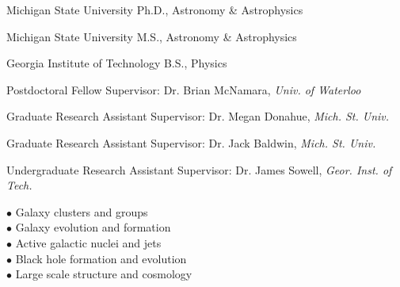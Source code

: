 \documentclass[12pt]{cv}
\begin{document}
\begin{llist}


Michigan State University
Ph.D., Astronomy \& Astrophysics

Michigan State University
M.S., Astronomy \& Astrophysics

Georgia Institute of Technology
B.S., Physics


Postdoctoral Fellow
Supervisor: Dr. Brian McNamara, {\textit{Univ. of Waterloo}}

Graduate Research Assistant
Supervisor: Dr. Megan Donahue, {\textit{Mich. St. Univ.}}

Graduate Research Assistant
Supervisor: Dr. Jack Baldwin, {\textit{Mich. St. Univ.}}

Undergraduate Research Assistant
Supervisor: Dr. James Sowell, {\textit{Geor. Inst. of Tech.}}


$\bullet$ Galaxy clusters and groups\\
$\bullet$ Galaxy evolution and formation\\
$\bullet$ Active galactic nuclei and jets\\
$\bullet$ Black hole formation and evolution\\
$\bullet$ Large scale structure and cosmology


\end{llist}
\end{document}
